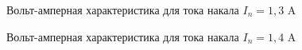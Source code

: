 \documentclass[a4paper,12pt]{article}
\begin{document}
\begin{figure} 
	\centering
	\caption{Вольт-амперная характеристика для тока накала $I_n = 1,3$ A}
	\label{mah}
\end{figure}

\begin{figure} 
	\centering
	\caption{Вольт-амперная характеристика для тока накала $I_n = 1,4$ A}
	\label{mah}
\end{figure}
\end{document}
